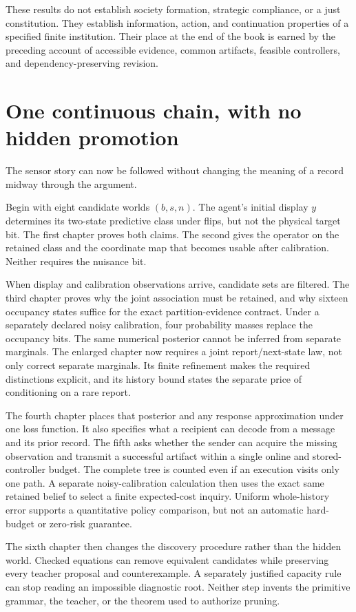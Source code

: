 \documentclass[11pt,oneside,openany]{book}
\theoremstyle{definition}\newtheorem{definition}[theorem]{Definition}
\begin{document}
These results do not establish society formation, strategic compliance, or a just constitution. They establish information, action, and continuation properties of a specified finite institution. Their place at the end of the book is earned by the preceding account of accessible evidence, common artifacts, feasible controllers, and dependency-preserving revision.

\chapter{One continuous chain, with no hidden promotion}\label{ch:close}
The sensor story can now be followed without changing the meaning of a record midway through the argument.

Begin with eight candidate worlds $(b,s,n)$. The agent's initial display $y$ determines its two-state predictive class under flips, but not the physical target bit. The first chapter proves both claims. The second gives the operator on the retained class and the coordinate map that becomes usable after calibration. Neither requires the nuisance bit.

When display and calibration observations arrive, candidate sets are filtered. The third chapter proves why the joint association must be retained, and why sixteen occupancy states suffice for the exact partition-evidence contract. Under a separately declared noisy calibration, four probability masses replace the occupancy bits. The same numerical posterior cannot be inferred from separate marginals. The enlarged chapter now requires a joint report/next-state law, not only correct separate marginals. Its finite refinement makes the required distinctions explicit, and its history bound states the separate price of conditioning on a rare report.

The fourth chapter places that posterior and any response approximation under one loss function. It also specifies what a recipient can decode from a message and its prior record. The fifth asks whether the sender can acquire the missing observation and transmit a successful artifact within a single online and stored-controller budget. The complete tree is counted even if an execution visits only one path. A separate noisy-calibration calculation then uses the exact same retained belief to select a finite expected-cost inquiry. Uniform whole-history error supports a quantitative policy comparison, but not an automatic hard-budget or zero-risk guarantee.

The sixth chapter then changes the discovery procedure rather than the hidden world. Checked equations can remove equivalent candidates while preserving every teacher proposal and counterexample. A separately justified capacity rule can stop reading an impossible diagnostic root. Neither step invents the primitive grammar, the teacher, or the theorem used to authorize pruning.
\end{document}

